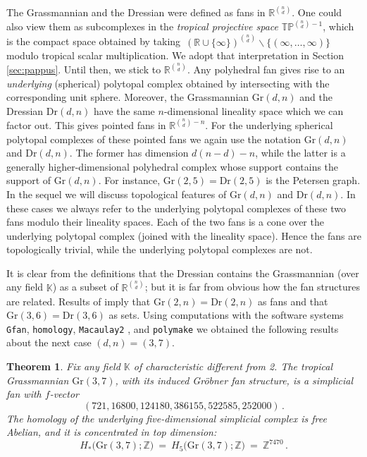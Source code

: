 \documentclass[12pt,a4paper]{amsart}
\newtheorem{thm}{Theorem}[section]
\theoremstyle{definition}
\newcommand{\K}{{\mathbb{K}}}
\newcommand{\R}{{\mathbb{R}}}
\newcommand{\Z}{{\mathbb{Z}}}
\newcommand{\Gr}{{\mathrm{Gr}}}
\newcommand{\Dr}{{\mathrm{Dr}}}
\newcommand{\TP}{{\mathbb{TP}}}
\providecommand\Macaulay{\texttt{Macaulay2}\xspace}
\providecommand\Gfan{\texttt{Gfan}\xspace}
\providecommand\polymake{\texttt{polymake}\xspace}
\providecommand\homology{\texttt{homology}\xspace}
\begin{document}
The Grassmannian and the Dressian were defined as fans in
$\R^{\binom{n}{d}}$.  One could also view them as subcomplexes in the
\emph{tropical projective space} $\TP^{\binom{n}{d}-1}$, which is the
compact space obtained by taking $\,(\R \cup
\{\infty\})^{\binom{n}{d}} \backslash \{(\infty, \ldots, \infty)\} \,$
modulo tropical scalar multiplication.  We adopt that interpretation
in Section \ref{sec:pappus}.  Until then, we stick to
$\R^{\binom{n}{d}}$.  Any polyhedral fan gives rise to an
\emph{underlying} (spherical) polytopal complex obtained by
intersecting with the corresponding unit sphere.  Moreover, the
Grassmannian $\Gr(d,n)$ and the Dressian $\Dr(d,n)$ have the same
$n$-dimensional lineality space which we can factor out.  This gives
pointed fans in $\R^{\binom{n}{d} - n}$.  For the underlying spherical
polytopal complexes of these pointed fans we again use the notation
$\Gr(d,n)$ and $\Dr(d,n)$.  The former has dimension $d(n-d)-n$, while
the latter is a generally higher-dimensional polyhedral complex whose
support contains the support of $\Gr(d,n)$.  For instance, $\Gr(2,5) =
\Dr(2,5)$ is the Petersen graph.  In the sequel we will discuss
topological features of $\Gr(d,n)$ and $\Dr(d,n)$.  In these cases we
always refer to the underlying polytopal complexes of these two fans
modulo their lineality spaces.  Each of the two fans is a cone over
the underlying polytopal complex (joined with the lineality space).
Hence the fans are topologically trivial, while the underlying
polytopal complexes are not.

It is clear from the definitions that the Dressian contains the
Grassmannian (over any field $\K$) as a subset of $\R^{\binom{n}{d}}$;
but it is far from obvious how the fan structures are related.  
Results of \cite{SS} imply that $\Gr(2,n) = \Dr(2,n)$ as fans and that
$\Gr(3,6) = \Dr(3,6)$ as sets.  Using computations with the software
systems \Gfan \cite{Gfan}, \homology \cite{homology}, \Macaulay
\cite{M2}, and \polymake \cite{polymake} we obtained the following
results about the next case $(d,n)=(3,7)$.

\begin{thm}
  \label{thm:Gr37}
  Fix any field $\K$ of characteristic different from 2.  The
  tropical Grassmannian $\Gr(3,7)$, with its induced Gr\"obner fan
  structure, is a simplicial fan with $f$-vector
  \[
  (721, 16800, 124180, 386155, 522585, 252000) \, .
  \]
  The homology of the underlying five-dimensional simplicial complex
  is free Abelian, and it is concentrated in top dimension:
  \[
  H_*\bigl( \Gr(3,7); \Z \bigr) \ = \ H_5\bigl( \Gr(3,7); \Z \bigr)
  \ = \ \Z^{7470} \, .
  \]
\end{thm}
\end{document}
